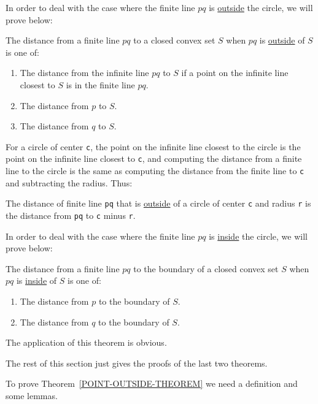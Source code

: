 \documentclass[12pt]{article}
\begin{document}
In order to deal with the case where the finite line $pq$ is
\underline{outside}
the circle, we will prove below:

\begin{theorem}\label{POINT-OUTSIDE-THEOREM}
The distance from a finite line $pq$ to a closed convex set $S$ when
$pq$ is \underline{outside} of $S$ is one of:
\begin{enumerate}
\item The distance from the infinite line $pq$ to $S$ if
a point on the infinite line closest to $S$ is in the finite line $pq$.
\item The distance from $p$ to $S$.
\item The distance from $q$ to $S$.
\end{enumerate}
\end{theorem}

For a circle of center {\tt c}, the point on the infinite line
closest to the circle is the point on the infinite line closest
to {\tt c}, and computing the distance from a finite line to the
circle is the same as computing the distance from the finite line
to {\tt c} and subtracting the radius.  Thus:

\begin{corollary}
The distance of finite line {\tt pq} that is \underline{outside}
of a circle of center {\tt c} and radius {\tt r} is the distance
from {\tt pq} to {\tt c} minus {\tt r}.
\end{corollary}

In order to deal with the case where the finite line $pq$ is
\underline{inside}
the circle, we will prove below:

\begin{theorem}\label{POINT-INSIDE-THEOREM}
The distance from a finite line $pq$ to the boundary of a
closed convex set $S$ when
$pq$ is \underline{inside} of $S$ is one of:
\begin{enumerate}
\item The distance from $p$ to the boundary of $S$.
\item The distance from $q$ to the boundary of $S$.
\end{enumerate}
\end{theorem}

The application of this theorem is obvious.

The rest of this section just gives the proofs of the last two
theorems.

To prove Theorem~\ref{POINT-OUTSIDE-THEOREM}
we need a definition and some lemmas.
\end{document}
